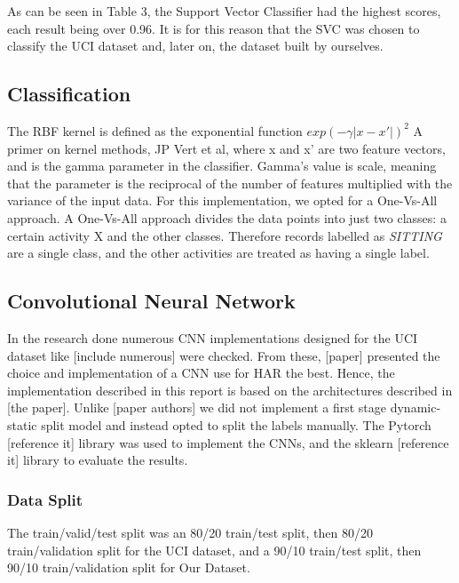         As can be seen in Table 3, the Support Vector Classifier had the highest scores, each result being over 0.96. It is for this reason that the SVC
        was chosen to classify the UCI dataset \cite{Anguita2013} and, later on, the dataset built by ourselves.

    \subsection{Classification}
        The RBF kernel is defined as the exponential function \(exp(-\gamma \lvert x-x' \rvert)^2\) A primer on kernel methods, JP Vert et al, where x and x’ are two feature vectors, and is the
        gamma parameter in the classifier. Gamma’s value is scale, meaning that the parameter is the reciprocal of the number of features multiplied with the variance of the input data.
        For this implementation, we opted for a One-Vs-All approach. A One-Vs-All approach divides the data points into just two classes: a certain activity X and the other classes. Therefore records
        labelled as \emph{SITTING} are a single class, and the other activities are treated as having a single label.

\subsection{Convolutional Neural Network}
    In the research done numerous CNN implementations designed for the UCI dataset like [include numerous] were checked.
    From these, [paper] presented the choice and implementation of a CNN use for HAR the best.
    Hence, the implementation described in this report is based on the architectures described in [the paper].
    Unlike [paper authors] we did not  implement a first stage dynamic-static split model and instead opted to split the labels manually.
    The Pytorch [reference it] library was used to implement the CNNs, and the sklearn [reference it] library to evaluate the results.

    \subsubsection{Data Split}
        The train/valid/test split was an 80/20 train/test split, then 80/20 train/validation split for the UCI dataset, and a 90/10 train/test split, then 90/10 train/validation split for Our Dataset.
